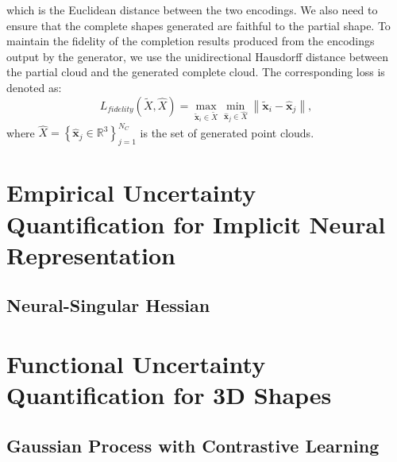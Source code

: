         which is the Euclidean distance between the two encodings. We also need to ensure that the complete shapes generated are faithful to the partial shape. To maintain the fidelity of the completion results produced from the encodings output by the generator, we use the unidirectional Hausdorff distance between the partial cloud and the generated complete cloud. The corresponding loss is denoted as:
        \begin{equation}\label{fidelity_loss}
            L_{fidelity}(\tilde{X}, \hat{X}) = \max_{\mathbf{\tilde{x}}_{i} \in \tilde{X}} \min_{\mathbf{\hat{x}}_{j} \in \hat{X}} \left\|\mathbf{\tilde{x}}_{i}-\mathbf{\hat{x}}_{j}\right\|,
        \end{equation}
        where $\hat{X}=\left\{\mathbf{\hat{x}}_{j} \in \mathbb{R}^{3}\right\}_{j=1}^{N_C}$ is the set of generated point clouds.

\section{Empirical Uncertainty Quantification for Implicit Neural Representation}



    \subsection{Neural-Singular Hessian}



\section{Functional Uncertainty Quantification for 3D Shapes}



    \subsection{Gaussian Process with Contrastive Learning}



